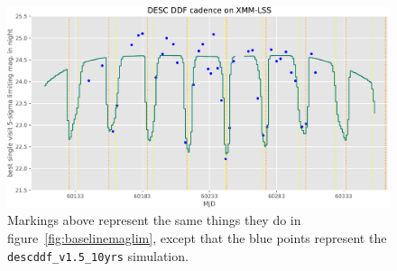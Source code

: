 \documentclass[DM,authoryear,toc]{lsstdoc}
\begin{document}
\begin{figure}
\centering
\includegraphics[width=\linewidth]{figures/desc_v1_5_10yrs_xmmlss.pdf}
\caption{\label{fig:descmaglim}
  Markings above represent the same things they do in figure~\ref{fig:baselinemaglim}, except that the blue points represent the \texttt{descddf\_v1.5\_10yrs} simulation.
}
\end{figure}
\end{document}
